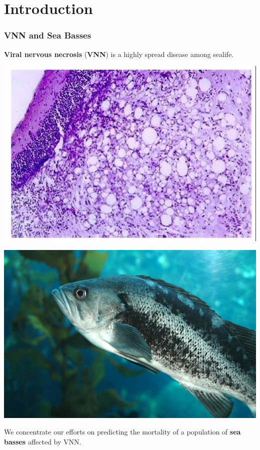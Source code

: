\documentclass[aspectratio=169]{beamer}
\begin{document}
\section{Introduction}
\begin{frame}
\frametitle{VNN and Sea Basses}

\begin{minipage}{0.49\textwidth}
  \textbf{Viral nervous necrosis} (\textbf{VNN}) is a highly spread disease among sealife.

\end{minipage}
\begin{minipage}{0.49\textwidth}
    \centering\includegraphics[width=0.7\linewidth]{figures/VNN.jpg}
\end{minipage}

\begin{minipage}{0.49\textwidth}
    \centering\includegraphics[width=0.7\linewidth]{figures/Black-Sea-Bass-303435837.jpg}
\end{minipage}
\begin{minipage}{0.49\textwidth}
  We concentrate our efforts on predicting the mortality of a population of \textbf{sea basses} affected by VNN.
\end{minipage}

\end{frame}
\end{document}
